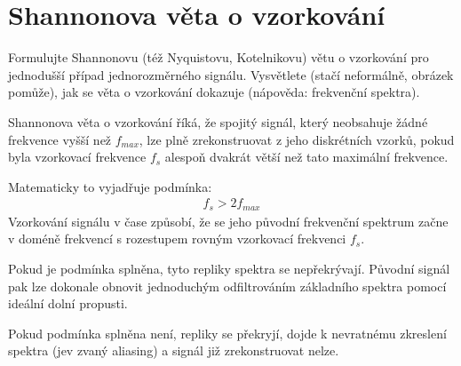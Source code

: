 \section{Shannonova věta o vzorkování}
Formulujte Shannonovu (též Nyquistovu, Kotelnikovu) větu o vzorkování pro jednodušší případ jednorozměrného 
signálu. Vysvětlete (stačí neformálně, obrázek pomůže), jak se věta o vzorkování dokazuje (nápověda: frekvenční 
spektra).

Shannonova věta o vzorkování říká, že spojitý signál, který neobsahuje žádné frekvence vyšší než $f_{max}$, lze plně 
zrekonstruovat z jeho diskrétních vzorků, pokud byla vzorkovací frekvence $f_s$ alespoň dvakrát větší než tato maximální 
frekvence.

Matematicky to vyjadřuje podmínka: 
\begin{align}
    f_s > 2 f_{max}
\end{align}
Vzorkování signálu v čase způsobí, že se jeho původní frekvenční spektrum začne v doméně frekvencí 
 s rozestupem rovným vzorkovací frekvenci $f_s$. 

Pokud je podmínka splněna, tyto repliky spektra se nepřekrývají. Původní signál pak lze dokonale obnovit jednoduchým 
odfiltrováním základního spektra pomocí ideální dolní propusti.

Pokud podmínka splněna není, repliky se překryjí, dojde k nevratnému zkreslení spektra (jev zvaný aliasing) a signál 
již zrekonstruovat nelze.
